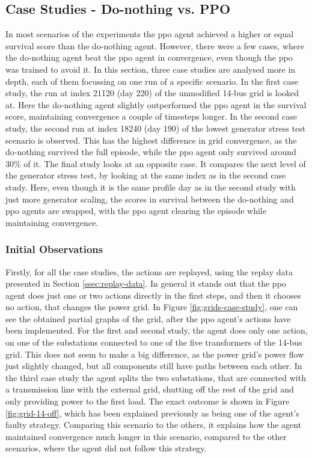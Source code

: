 \subsection{Case Studies - Do-nothing vs. PPO}\label{ssec:case-studies}
In most scenarios of the experiments the \ac{ppo} agent achieved a higher or equal survival score than the do-nothing agent. However, there were a few cases, where the do-nothing agent beat the \ac{ppo} agent in convergence, even though the \ac{ppo} was trained to avoid it. In this section, three case studies are analysed more in depth, each of them focussing on one run of a specific scenario. In the first case study, the run at index 21120 (day 220) of the unmodified 14-bus grid is looked at. Here the do-nothing agent slightly outperformed the \ac{ppo} agent in the survival score, maintaining convergence a couple of timesteps longer. In the second case study, the second run at index 18240 (day 190) of the lowest generator stress test scenario is observed. This has the highest difference in grid convergence, as the do-nothing survived the full episode, while the \ac{ppo} agent only survived around 30\% of it. The final study looks at an opposite case. It compares the next level of the generator stress test, by looking at the same index as in the second case study. Here, even though it is the same profile day as in the second study with just more generator scaling, the scores in survival between the do-nothing and \ac{ppo} agents are swapped, with the \ac{ppo} agent clearing the episode while maintaining convergence.  

\subsubsection{Initial Observations} 
Firstly, for all the case studies, the actions are replayed, using the replay data presented in Section \ref{ssec:replay-data}. In general it stands out that the \ac{ppo} agent does just one or two actions directly in the first steps, and then it chooses no action, that changes the power grid. In Figure \ref{fig:grids-case-study}, one can see the obtained partial graphs of the grid, after the \ac{ppo} agent's actions have been implemented. For the first and second study, the agent does only one action, on one of the substations connected to one of the five transformers of the 14-bus grid. This does not seem to make a big difference, as the power grid's power flow just slightly changed, but all components still have paths between each other. In the third case study the agent splits the two substations, that are connected with a transmission line with the external grid, shutting off the rest of the grid and only providing power to the first load. The exact outcome is shown in Figure \ref{fig:grid-14-off}, which has been explained previously as being one of the agent's faulty strategy. Comparing this scenario to the others, it explains how the agent maintained convergence much longer in this scenario, compared to the other scenarios, where the agent did not follow this strategy. 

